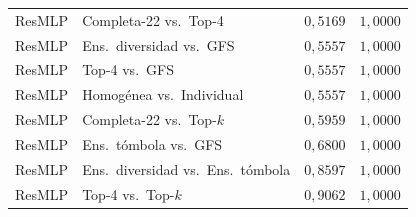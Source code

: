\begin{table}[H]
\begin{tabular}{@{}llrr@{}}
ResMLP & Completa-22 vs.\ Top-4 & $0{,}5169$ & $1{,}0000$ \\
ResMLP & Ens.\ diversidad vs.\ GFS & $0{,}5557$ & $1{,}0000$ \\
ResMLP & Top-4 vs.\ GFS & $0{,}5557$ & $1{,}0000$ \\
ResMLP & Homogénea vs.\ Individual & $0{,}5557$ & $1{,}0000$ \\
ResMLP & Completa-22 vs.\ Top-$k$ & $0{,}5959$ & $1{,}0000$ \\
ResMLP & Ens.\ tómbola vs.\ GFS & $0{,}6800$ & $1{,}0000$ \\
ResMLP & Ens.\ diversidad vs.\ Ens.\ tómbola & $0{,}8597$ & $1{,}0000$ \\
ResMLP & Top-4 vs.\ Top-$k$ & $0{,}9062$ & $1{,}0000$ \\
\bottomrule
\end{tabular}
\end{table}
